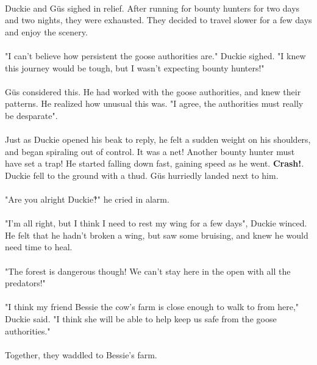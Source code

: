\paragraph{} Duckie and Güs sighed in relief. After running for bounty hunters for two days and two nights, they were exhausted. They decided to travel slower for a few days and enjoy the scenery. 
\paragraph{} "I can't believe how persistent the goose authorities are." Duckie sighed. "I knew this journey would be tough, but I wasn't expecting bounty hunters!"
\paragraph{} Güs considered this. He had worked with the goose authorities, and knew their patterns. He realized how unusual this was. "I agree, the authorities must really be desparate".
\paragraph{} Just as Duckie opened his beak to reply, he felt a sudden weight on his shoulders, and began spiraling out of control. It was a net! Another bounty hunter must have set a trap! He started falling down fast, gaining speed as he went. \textbf{Crash!}. Duckie fell to the ground with a thud. Güs hurriedly landed next to him. 
\paragraph{} "Are you alright Duckie‽" he cried in alarm.
\paragraph{} "I'm all right, but I think I need to rest my wing for a few days", Duckie winced. He felt that he hadn't broken a wing, but saw some bruising, and knew he would need time to heal. 
 \paragraph{} "The forest is dangerous though! We can't stay here in the open with all the predators!"
 \paragraph{} "I think my friend Bessie the cow's farm is close enough to walk to from here," Duckie said. "I think she will be able to help keep us safe from the goose authorities."
 \paragraph{} Together, they waddled to Bessie's farm.